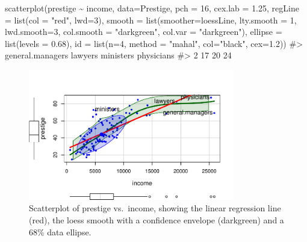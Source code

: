 \documentclass[
  letterpaper,
  10pt,
  krantz2]{krantz}
\makeatletter
\newenvironment{Shaded}{\begin{snugshade}}{\end{snugshade}}
\newcommand{\AttributeTok}[1]{\textcolor[rgb]{0.40,0.45,0.13}{#1}}
\newcommand{\CommentTok}[1]{\textcolor[rgb]{0.37,0.37,0.37}{#1}}
\newcommand{\DecValTok}[1]{\textcolor[rgb]{0.68,0.00,0.00}{#1}}
\newcommand{\FloatTok}[1]{\textcolor[rgb]{0.68,0.00,0.00}{#1}}
\newcommand{\FunctionTok}[1]{\textcolor[rgb]{0.28,0.35,0.67}{#1}}
\newcommand{\NormalTok}[1]{\textcolor[rgb]{0.00,0.23,0.31}{#1}}
\newcommand{\SpecialCharTok}[1]{\textcolor[rgb]{0.37,0.37,0.37}{#1}}
\newcommand{\StringTok}[1]{\textcolor[rgb]{0.13,0.47,0.30}{#1}}
\newenvironment{kframe}{%
  \medskip{}
  \setlength{\fboxsep}{.8em}
  \def\at@end@of@kframe{}%
  \ifinner\ifhmode%
  \def\at@end@of@kframe{\end{minipage}}%
  \begin{minipage}{\columnwidth}%
  \fi\fi%
  \def\FrameCommand##1{\hskip\@totalleftmargin \hskip-\fboxsep
  \colorbox{shadecolor}{##1}\hskip-\fboxsep
      \hskip-\linewidth \hskip-\@totalleftmargin \hskip\columnwidth}%
  \MakeFramed {\advance\hsize-\width
    \@totalleftmargin\z@ \linewidth\hsize
    \@setminipage}}%
{\par\unskip\endMakeFramed%
  \at@end@of@kframe}
\renewenvironment{Shaded}{\begin{kframe}}{\end{kframe}}
\makeatother
\begin{document}
\begin{Shaded}
\begin{Highlighting}[]
\FunctionTok{scatterplot}\NormalTok{(prestige }\SpecialCharTok{\textasciitilde{}}\NormalTok{ income, }\AttributeTok{data=}\NormalTok{Prestige,}
  \AttributeTok{pch =} \DecValTok{16}\NormalTok{, }\AttributeTok{cex.lab =} \FloatTok{1.25}\NormalTok{,}
  \AttributeTok{regLine =} \FunctionTok{list}\NormalTok{(}\AttributeTok{col =} \StringTok{"red"}\NormalTok{, }\AttributeTok{lwd=}\DecValTok{3}\NormalTok{),}
  \AttributeTok{smooth =} \FunctionTok{list}\NormalTok{(}\AttributeTok{smoother=}\NormalTok{loessLine, }
                \AttributeTok{lty.smooth =} \DecValTok{1}\NormalTok{, }\AttributeTok{lwd.smooth=}\DecValTok{3}\NormalTok{,}
                \AttributeTok{col.smooth =} \StringTok{"darkgreen"}\NormalTok{, }\AttributeTok{col.var =} \StringTok{"darkgreen"}\NormalTok{),}
  \AttributeTok{ellipse =} \FunctionTok{list}\NormalTok{(}\AttributeTok{levels =} \FloatTok{0.68}\NormalTok{),}
  \AttributeTok{id =} \FunctionTok{list}\NormalTok{(}\AttributeTok{n=}\DecValTok{4}\NormalTok{, }\AttributeTok{method =} \StringTok{"mahal"}\NormalTok{, }\AttributeTok{col=}\StringTok{"black"}\NormalTok{, }\AttributeTok{cex=}\FloatTok{1.2}\NormalTok{))}
\CommentTok{\#\textgreater{} general.managers          lawyers        ministers       physicians }
\CommentTok{\#\textgreater{}                2               17               20               24}
\end{Highlighting}
\end{Shaded}

\begin{figure}[H]

{\centering \includegraphics[width=0.8\textwidth,height=\textheight]{figs/ch03/fig-Prestige-scatterplot-income1-1.pdf}

}

\caption{\label{fig-Prestige-scatterplot-income1}Scatterplot of prestige
vs.~income, showing the linear regression line (red), the loess smooth
with a confidence envelope (darkgreen) and a 68\% data ellipse.}

\end{figure}
\end{document}

